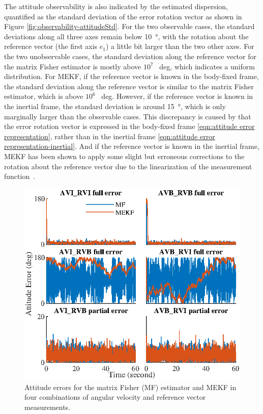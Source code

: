 The attitude observability is also indicated by the estimated dispersion, quantified as the standard deviation of the error rotation vector as shown in Figure \ref{fig:observability-attitudeStd}.
For the two observable cases, the standard deviations along all three axes remain below \SI{10}{\degree}, with the rotation about the reference vector (the first axis $e_1$) a little bit larger than the two other axes.
For the two unobservable cases, the standard deviation along the reference vector for the matrix Fisher estimator is mostly above $10^7$ \SI{}{deg}, which  indicates a uniform distribution.
For MEKF, if the reference vector is known in the body-fixed frame, the standard deviation along the reference vector is similar to the matrix Fisher estimator, which is above $10^6$ \SI{}{deg}.
However, if the reference vector is known in the inertial frame, the standard deviation is around \SI{15}{\degree}, which is only marginally larger than the observable cases.
This discrepancy is caused by that the error rotation vector is expressed in the body-fixed frame \eqref{eqn:attitude error representation}, rather than in the inertial frame \eqref{eqn:attitude error representation-inertial}.
And if the reference vector is known in the inertial frame, MEKF has been shown to apply some slight but erroneous corrections to the rotation about the reference vector due to the linearization of the measurement function~\cite{li2012improving}.

\begin{figure}
	\centering
	\includegraphics[scale=1.4]{figures/observability/attitudeError}
	\caption{Attitude errors for the matrix Fisher (MF) estimator and MEKF in four combinations of angular velocity and reference vector measurements. \label{fig:observability-attitudeError}}
\end{figure}

